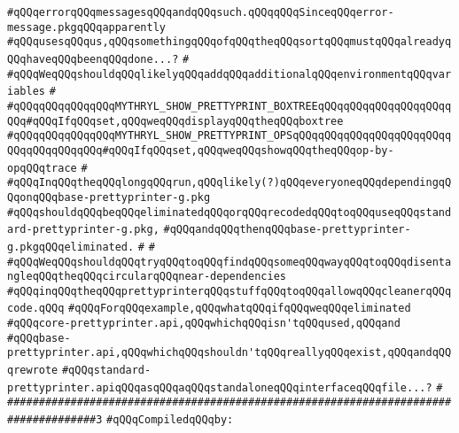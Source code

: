 \verb|#qQQqerrorqQQqmessagesqQQqandqQQqsuch.qQQqqQQqSinceqQQqerror-message.pkgqQQqapparently|\newline
\verb|#qQQqusesqQQqus,qQQqsomethingqQQqofqQQqtheqQQqsortqQQqmustqQQqalreadyqQQqhaveqQQqbeenqQQqdone...?|\newline
\verb|#|\newline
\verb|#qQQqWeqQQqshouldqQQqlikelyqQQqaddqQQqadditionalqQQqenvironmentqQQqvariables|\newline
\verb|#|\newline
\verb|#qQQqqQQqqQQqqQQqMYTHRYL_SHOW_PRETTYPRINT_BOXTREEqQQqqQQqqQQqqQQqqQQqqQQq#qQQqIfqQQqset,qQQqweqQQqdisplayqQQqtheqQQqboxtree|\newline
\verb|#qQQqqQQqqQQqqQQqMYTHRYL_SHOW_PRETTYPRINT_OPSqQQqqQQqqQQqqQQqqQQqqQQqqQQqqQQqqQQqqQQq#qQQqIfqQQqset,qQQqweqQQqshowqQQqtheqQQqop-by-opqQQqtrace|\newline
\verb|#|\newline
\verb|#qQQqInqQQqtheqQQqlongqQQqrun,qQQqlikely(?)qQQqeveryoneqQQqdependingqQQqonqQQqbase-prettyprinter-g.pkg|\newline
\verb|#qQQqshouldqQQqbeqQQqeliminatedqQQqorqQQqrecodedqQQqtoqQQquseqQQqstandard-prettyprinter-g.pkg,|\newline
\verb|#qQQqandqQQqthenqQQqbase-prettyprinter-g.pkgqQQqeliminated.|\newline
\verb|#|\newline
\verb|#|\newline
\verb|#qQQqWeqQQqshouldqQQqtryqQQqtoqQQqfindqQQqsomeqQQqwayqQQqtoqQQqdisentangleqQQqtheqQQqcircularqQQqnear-dependencies|\newline
\verb|#qQQqinqQQqtheqQQqprettyprinterqQQqstuffqQQqtoqQQqallowqQQqcleanerqQQqcode.qQQq|\newline
\verb|#qQQqForqQQqexample,qQQqwhatqQQqifqQQqweqQQqeliminated|\newline
\verb|#qQQqcore-prettyprinter.api,qQQqwhichqQQqisn'tqQQqused,qQQqand|\newline
\verb|#qQQqbase-prettyprinter.api,qQQqwhichqQQqshouldn'tqQQqreallyqQQqexist,qQQqandqQQqrewrote|\newline
\verb|#qQQqstandard-prettyprinter.apiqQQqasqQQqaqQQqstandaloneqQQqinterfaceqQQqfile...?|\newline
\verb|#|\newline
\verb|####################################################################################3|\newline
\newline
\verb|#qQQqCompiledqQQqby:|\newline
